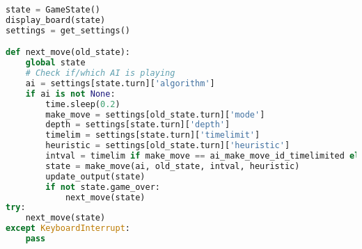 \begin{lstlisting}[language=Python]
state = GameState()
display_board(state)
settings = get_settings()

def next_move(old_state):
    global state
    # Check if/which AI is playing
    ai = settings[state.turn]['algorithm']
    if ai is not None:
        time.sleep(0.2)
        make_move = settings[old_state.turn]['mode']
        depth = settings[state.turn]['depth']
        timelim = settings[state.turn]['timelimit']
        heuristic = settings[old_state.turn]['heuristic']
        intval = timelim if make_move == ai_make_move_id_timelimited else depth
        state = make_move(ai, old_state, intval, heuristic)
        update_output(state)
        if not state.game_over:
            next_move(state)
try:
    next_move(state)
except KeyboardInterrupt:
    pass
\end{lstlisting}
